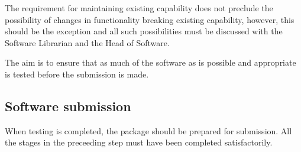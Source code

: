 \documentclass[twoside,11pt]{article}
\newcommand{\xlabel}[1]{}
\begin{document}
\begin{description}
\begin{enumerate}
The requirement for maintaining existing capability does not preclude
the possibility of changes in functionality breaking existing
capability, however, this should be the exception and all such
possibilities must be discussed with the Software Librarian and the
Head of Software.

\end{enumerate}

The aim is to ensure that as much of the software as is possible and
appropriate is tested before the submission is made.

\end{description}

\subsection{\label{software_submission}\xlabel{software_submission}Software submission}

When testing is completed, the package should be prepared for
submission.  All the stages in the preceeding step must have been
completed satisfactorily.
\end{document}
